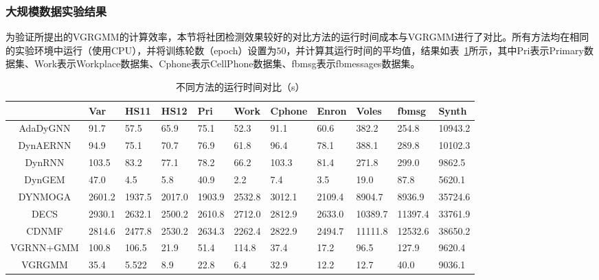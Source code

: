 \subsubsection{大规模数据实验结果}
为验证所提出的VGRGMM的计算效率，本节将社团检测效果较好的对比方法的运行时间成本与VGRGMM进行了对比。所有方法均在相同的实验环境中运行（使用CPU），并将训练轮数（epoch）设置为$50$，并计算其运行时间的平均值，结果如表~\ref{tab2}所示，其中Pri表示Primary数据集、Work表示Workplace数据集、Cphone表示CellPhone数据集、fbmsg表示fbmessages数据集。
\begin{table}[!htbp]
	\centering
		\caption{\label{tab2}不同方法的运行时间对比（s）}
		\vspace{0.5em}\centering\wuhao
		\begin{tabular}{cp{0.6cm}p{0.7cm}p{0.7cm}p{0.7cm}p{0.7cm}p{0.7cm}p{0.7cm}p{0.85cm}p{0.85cm}p{0.7cm}}
			\hline
			\diagbox{方法名}{数据集}& Var & HS11 & HS12 & Pri & Work & Cphone & Enron & Voles & fbmsg & Synth \\
			\hline
			AdaDyGNN & 91.7 & 57.5 & 65.9 & 75.1 & 52.3 & 91.1 & 60.6 & 382.2  & 254.8 & 10943.2\\
			
			DynAERNN & 94.9 & 75.1 & 70.7 & 76.9 & 61.8 & 96.4 & 78.1 & 388.1 & 289.8 & 10102.3\\
			
			DynRNN & 103.5 & 83.2 & 77.1 & 78.2 & 66.2 &103.3 & 81.4 &271.8 & 299.0 & 9862.5\\
			
			DynGEM & 47.0 & 4.5 & 5.8 & 40.9 & 2.2  & 7.4 &   3.5 & 19.0 & 87.8 & 5620.1 \\
			
			DYNMOGA & 2601.2& 1937.5 & 2017.0 & 1903.9 & 2532.8 & 3012.1 & 2109.4 & 8904.7 & 8936.9 & 35724.6\\
			
			DECS & 2930.1 & 2632.1 & 2500.2 & 2610.8 & 2712.0 & 2812.9 &  2633.0 & 10389.7 & 11397.4 & 33761.9\\
			
			CDNMF & 2814.6 & 2477.8 & 2530.2 & 2634.3 & 2262.4 &2822.9 & 2494.7 & 11111.8 & 12532.6 & 38650.2\\
			
			VGRNN+GMM & 100.8 & 106.5 & 21.9 & 51.4 & 114.8 & 37.4 &  17.2 & 96.5 & 127.9 & 9620.4\\
			
			VGRGMM & 35.4 & 5.522 & 8.9 & 22.8 & 6.4& 32.9 &  12.2 & 12.7 & 40.0 & 9036.1\\
			\hline
		\end{tabular} 
		
\end{table}



